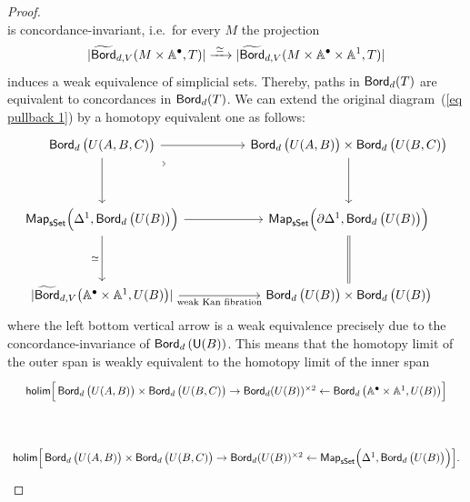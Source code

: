 \begin{proof}
\begin{equation}
    \end{equation}
    is concordance-invariant, i.e.\ for every $M$ the projection
    \[
    |\widetilde{\operatorname{\mathsf{Bord}}}_{d,V}(M\times \mathbb A^{\bullet},T)| \xrightarrow{\,\,\simeq\,\,} |\widetilde{\operatorname{\mathsf{Bord}}}_{d,V}(M\times \mathbb A^{\bullet}\times \mathbb A^1,T)|
    \]
    induces a weak equivalence of simplicial sets. Thereby, paths in $\operatorname{\mathsf{Bord}}_d(T)$ are equivalent to concordances in $\operatorname{\mathsf{Bord}}_d(T)$. We can extend the original diagram~(\ref{eq pullback 1}) by a homotopy equivalent one as follows:
    \begin{equation}
        \begin{tikzcd}[ampersand replacement=\&]
            {\bord_d\big(U(A,B,C)\big)} \&\& {\bord_d\big(U(A,B)\big)\times \bord_d\big(U(B,C)\big)} \\
            \\
            {\mathsf{Map}_{\sset}\Big(\Delta^1,\bord_d\big(U(B)\big)\Big)} \&\& {\mathsf{Map}_{\sset}\Big(\partial\Delta^1,\bord_d\big(U(B)\big)\Big)} \\
            \\
            {|\widetilde{\bord}_{d,V}\big(\AA^{\bullet}\times \AA^1,U(B)\big)|} \&\& {\bord_d\big(U(B)\big)\times \bord_d\big(U(B)\big)}
            \arrow[from=1-1, to=1-3]
            \arrow[from=1-1, to=3-1]
            \arrow["\lrcorner"{anchor=center, pos=0.125, rotate=45}, draw=none, from=1-1, to=3-3]
            \arrow[from=1-3, to=3-3]
            \arrow[from=3-1, to=3-3]
            \arrow["\simeq"', from=3-1, to=5-1]
            \arrow[equals, from=3-3, to=5-3]
            \arrow["{\text {weak Kan fibration}}"', from=5-1, to=5-3]
        \end{tikzcd}
    \end{equation} 
    where the left bottom vertical arrow is a weak equivalence precisely due to the concordance-invariance of $\operatorname{\mathsf{Bord}}_d\left(\mathsf U(B)\right)$. This means that the homotopy limit of the outer span is weakly equivalent to the homotopy limit of the inner span
    \begin{equation}
        \begin{tikzcd}[ampersand replacement=\&]
            {\mathsf{holim}\Big[\bord_d\big(U(A,B)\big)\times \bord_d\big(U(B,C)\big) \ra \bord_d (U(B))^{\times 2} \la \bord_d\big(\AA^{\bullet}\times \AA^1,U(B)\big)\Big]} \\
            \\
            {\mathsf{holim}\Big[\bord_d\big(U(A,B)\big)\times \bord_d\big(U(B,C)\big) \ra \bord_d (U(B))^{\times 2}\la \mathsf{Map}_{\sset}\Big(\Delta^1, \bord_d\big(U(B)\big)\Big)\Big]}.

\end{tikzcd}
\end{equation}
\end{proof}
